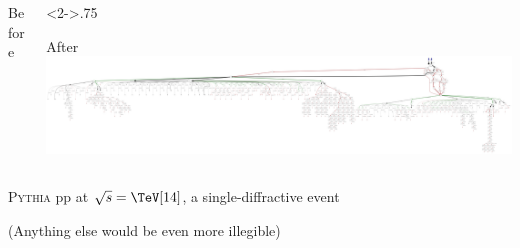 \documentclass[compress,table,8pt]{beamer}
\newcommand\Pythia{{\scshape Pythia}}
\begin{document}
\begin{frame}
\begin{columns}[t,onlytextwidth]
\begin{column}{.2\linewidth}
\begin{block}{Before}
      \end{block}
    \end{column}
    \begin{column}<2->{.75\linewidth}
      \begin{block}{After}
        \includegraphics[width=\linewidth]{genpythia_Kine_event000000.gv.pdf}
      \end{block}
    \end{column}
  \end{columns}
  \Pythia{} pp at $\sqrt{s}=\TeV[14]$, a single-diffractive event

  {\footnotesize(Anything else would be even more illegible)}
\end{frame}
\end{document}
